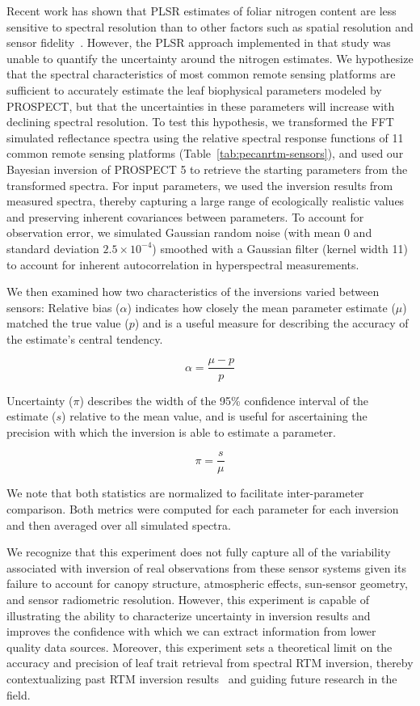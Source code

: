 Recent work has shown that PLSR estimates of foliar nitrogen content are less sensitive to spectral resolution than to other factors such as spatial resolution and sensor fidelity~\cite{lepine_2016_examining}.
However, the PLSR approach implemented in that study was unable to quantify the uncertainty around the nitrogen estimates.
We hypothesize that the spectral characteristics of most common remote sensing platforms are sufficient to accurately estimate the leaf biophysical parameters modeled by PROSPECT, but that the uncertainties in these parameters will increase with declining spectral resolution.
To test this hypothesis, we transformed the FFT simulated reflectance spectra using the relative spectral response functions of 11 common remote sensing platforms (Table~\ref{tab:pecanrtm-sensors}), %
and used our Bayesian inversion of PROSPECT 5 to retrieve the starting parameters from the transformed spectra.
For input parameters, we used the inversion results from measured spectra, thereby capturing a large range of ecologically realistic values and preserving inherent covariances between parameters.
To account for observation error, we simulated Gaussian random noise (with mean 0 and standard deviation $2.5 \times 10^{-4}$) smoothed with a Gaussian filter (kernel width 11) to account for inherent autocorrelation in hyperspectral measurements.%

We then examined how two characteristics of the inversions varied between sensors:
Relative bias ($\alpha$) indicates how closely the mean parameter estimate ($\mu$) matched the true value ($p$) and is a useful measure for describing the accuracy of the estimate's central tendency.

\[ \alpha = \frac{\mu - p}{p} \]

Uncertainty ($\pi$) describes the width of the 95\% confidence interval of the estimate ($s$) relative to the mean value,
and is useful for ascertaining the precision with which the inversion is able to estimate a parameter.

\[ \pi = \frac{s}{\mu} \]

We note that both statistics are normalized to facilitate inter-parameter comparison.
Both metrics were computed for each parameter for each inversion and then averaged over all simulated spectra.

We recognize that this experiment does not fully capture all of the variability associated with inversion of real observations from these sensor systems given its failure to account for canopy structure, atmospheric effects, sun-sensor geometry, and sensor radiometric resolution.
However, this experiment is capable of illustrating the ability to characterize uncertainty in inversion results and improves the confidence with which we can extract information from lower quality data sources.
Moreover, this experiment sets a theoretical limit on the accuracy and precision of leaf trait retrieval from spectral RTM inversion, thereby contextualizing past RTM inversion results~\cite{zhang_2005_estimating,zhang_2006_characterization,zhang_2009_satellite,zhang_2012_estimating} and guiding future research in the field.

